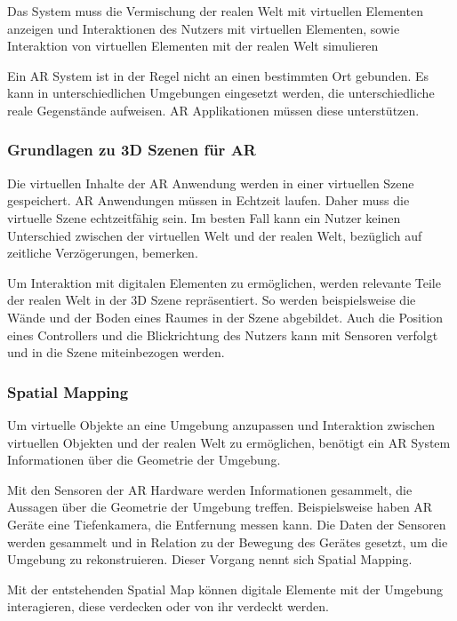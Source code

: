 Das System muss die Vermischung der realen Welt mit virtuellen Elementen anzeigen und Interaktionen des Nutzers mit virtuellen Elementen, sowie Interaktion von virtuellen Elementen mit der realen Welt simulieren

Ein AR System ist in der Regel nicht an einen bestimmten Ort gebunden. Es kann in unterschiedlichen Umgebungen eingesetzt werden, die unterschiedliche reale Gegenstände aufweisen. AR Applikationen müssen diese unterstützen.\citep{GrundlagenAR}


\subsubsection{Grundlagen zu 3D Szenen für AR}



Die virtuellen Inhalte der AR Anwendung werden in einer virtuellen Szene gespeichert. 
AR Anwendungen müssen in Echtzeit laufen. Daher muss die virtuelle Szene echtzeitfähig sein.
Im besten Fall kann ein Nutzer keinen Unterschied zwischen der virtuellen Welt und der realen Welt, bezüglich auf zeitliche Verzögerungen, bemerken.

Um Interaktion mit digitalen Elementen zu ermöglichen, werden relevante Teile der realen Welt in der 3D Szene repräsentiert. 
So werden beispielsweise die Wände und der Boden eines Raumes in der Szene abgebildet. Auch die Position eines Controllers und die Blickrichtung des Nutzers kann mit Sensoren verfolgt und in die Szene miteinbezogen werden.

\subsubsection{Spatial Mapping} 
Um virtuelle Objekte an eine Umgebung anzupassen und Interaktion zwischen virtuellen Objekten und der realen Welt zu ermöglichen, benötigt ein AR System Informationen über die Geometrie der Umgebung.

Mit den Sensoren der AR Hardware werden Informationen gesammelt, die Aussagen über die Geometrie der Umgebung treffen. Beispielsweise haben AR Geräte eine Tiefenkamera, die Entfernung messen kann. Die Daten der Sensoren werden gesammelt und in Relation zu der Bewegung des Gerätes gesetzt, um die Umgebung zu rekonstruieren. Dieser Vorgang nennt sich Spatial Mapping. 

Mit der entstehenden Spatial Map können digitale Elemente mit der Umgebung interagieren, diese verdecken oder von ihr verdeckt werden.\citep{spatialMapping} 

